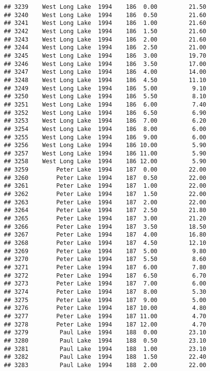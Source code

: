 \documentclass[
]{article}
\begin{document}
\begin{verbatim}
## 3239    West Long Lake  1994    186  0.00         21.50
## 3240    West Long Lake  1994    186  0.50         21.60
## 3241    West Long Lake  1994    186  1.00         21.60
## 3242    West Long Lake  1994    186  1.50         21.60
## 3243    West Long Lake  1994    186  2.00         21.60
## 3244    West Long Lake  1994    186  2.50         21.00
## 3245    West Long Lake  1994    186  3.00         19.70
## 3246    West Long Lake  1994    186  3.50         17.00
## 3247    West Long Lake  1994    186  4.00         14.00
## 3248    West Long Lake  1994    186  4.50         11.10
## 3249    West Long Lake  1994    186  5.00          9.10
## 3250    West Long Lake  1994    186  5.50          8.10
## 3251    West Long Lake  1994    186  6.00          7.40
## 3252    West Long Lake  1994    186  6.50          6.90
## 3253    West Long Lake  1994    186  7.00          6.20
## 3254    West Long Lake  1994    186  8.00          6.00
## 3255    West Long Lake  1994    186  9.00          6.00
## 3256    West Long Lake  1994    186 10.00          5.90
## 3257    West Long Lake  1994    186 11.00          5.90
## 3258    West Long Lake  1994    186 12.00          5.90
## 3259        Peter Lake  1994    187  0.00         22.00
## 3260        Peter Lake  1994    187  0.50         22.00
## 3261        Peter Lake  1994    187  1.00         22.00
## 3262        Peter Lake  1994    187  1.50         22.00
## 3263        Peter Lake  1994    187  2.00         22.00
## 3264        Peter Lake  1994    187  2.50         21.80
## 3265        Peter Lake  1994    187  3.00         21.20
## 3266        Peter Lake  1994    187  3.50         18.50
## 3267        Peter Lake  1994    187  4.00         16.80
## 3268        Peter Lake  1994    187  4.50         12.10
## 3269        Peter Lake  1994    187  5.00          9.80
## 3270        Peter Lake  1994    187  5.50          8.60
## 3271        Peter Lake  1994    187  6.00          7.80
## 3272        Peter Lake  1994    187  6.50          6.70
## 3273        Peter Lake  1994    187  7.00          6.00
## 3274        Peter Lake  1994    187  8.00          5.30
## 3275        Peter Lake  1994    187  9.00          5.00
## 3276        Peter Lake  1994    187 10.00          4.80
## 3277        Peter Lake  1994    187 11.00          4.70
## 3278        Peter Lake  1994    187 12.00          4.70
## 3279         Paul Lake  1994    188  0.00         23.10
## 3280         Paul Lake  1994    188  0.50         23.10
## 3281         Paul Lake  1994    188  1.00         23.10
## 3282         Paul Lake  1994    188  1.50         22.40
## 3283         Paul Lake  1994    188  2.00         22.00

\end{verbatim}
\end{document}
